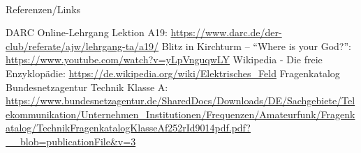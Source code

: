 \renewcommand{\refname}{Referenzen}

\hypertarget{refs}{}
\textcolor{white}{} \\ %
\Large Referenzen/Links
\footnotesize

\begin{thebibliography}{}
    DARC Online-Lehrgang Lektion A19:
    \url{https://www.darc.de/der-club/referate/ajw/lehrgang-ta/a19/}
    Blitz in Kirchturm -- ``Where is your God?'':
    \url{https://www.youtube.com/watch?v=yLpVnguqwLY}
      Wikipedia - Die freie Enzyklopädie:
    \url{https://de.wikipedia.org/wiki/Elektrisches_Feld}
     Fragenkatalog Bundesnetzagentur Technik Klasse A:
    \url{https://www.bundesnetzagentur.de/SharedDocs/Downloads/DE/Sachgebiete/Telekommunikation/Unternehmen_Institutionen/Frequenzen/Amateurfunk/Fragenkatalog/TechnikFragenkatalogKlasseAf252rId9014pdf.pdf?__blob=publicationFile&v=3}
\end{thebibliography}


